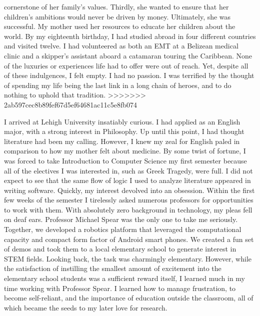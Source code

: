 \documentclass[10pt]{article}
\begin{document}
cornerstone of her family's values. Thirdly, she wanted to ensure that her
children's ambitions would never be driven by money. Ultimately, she was
successful. My mother used her resources to educate her children about the
world.  By my eighteenth birthday, I had studied abroad in four different
countries and visited twelve.  I had volunteered as both an EMT at a Belizean
medical clinic and a skipper's assistant aboard a catamaran touring the
Caribbean.  None of the luxuries or experiences life had to offer were out of
reach. Yet, despite all of these indulgences, I felt empty. I had no passion.
I was terrified by the thought of spending my life being the last link in a
long chain of heroes, and to do nothing to uphold that tradition.
>>>>>>> 2ab597cec8b89fef67d5ef64681ac11c5e8fb074

I arrived at Lehigh University insatiably curious. I had applied as an English
major, with a strong interest in Philosophy.  Up until this point, I had
thought literature had been my calling. However, I knew my zeal for English
paled in comparison to how my mother felt about medicine. By some twist of
fortune, I was forced to take Introduction to Computer Science my first
semester because all of the electives I was interested in, such as Greek
Tragedy, were full. I did not expect to see that the same flow of logic I used
to analyze literature appeared in writing software. Quickly, my interest
devolved into an obsession.  Within the first few weeks of the semester I
tirelessly asked numerous professors for opportunities to work with them.  With
absolutely zero background in technology, my pleas fell on deaf ears.
Professor Michael Spear was the only one to take me seriously. Together, we
developed a robotics platform that leveraged the computational capacity and
compact form factor of Android smart phones. We created a fun set of demos and
took them to a local elementary school to generate interest in STEM fields.
Looking back, the task was charmingly elementary. However, while the
satisfaction of instilling the smallest amount of excitement into the
elementary school students was a sufficient reward itself, I learned much in my
time working with Professor Spear.  I learned how to manage frustration, to
become self-reliant, and the importance of education outside the classroom, all
of which became the seeds to my later love for research.
\end{document}
